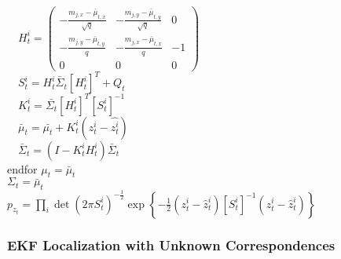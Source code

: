 \begin{algorithm}[H]
\BlankLine
$\quad H_t^i = \begin{pmatrix} -\frac{m_{j,x} - \bar{\mu}_{t,x}}{\sqrt{q}} & -\frac{m_{j,y} - \bar{\mu}_{t,y}}{\sqrt{q}} & 0 \\
                                -\frac{m_{j,y} - \bar{\mu}_{t,y}}{{q}} & -\frac{m_{j,x} - \bar{\mu}_{t,x}}{{q}} & -1  \\
                               0 & 0 & 0 \end{pmatrix}$ \\
\BlankLine
$\quad S_t^i = H_t^i \bar{\Sigma}_t [H_t^i]^T + Q_t$\\
$\quad K_t^i = \bar{\Sigma_t} [H_t^i]^T [S_t^i]^{-1}$\\
$\quad \bar{\mu}_t = \bar{\mu_t} + K_t^i (z_t^i - \hat{z_t^i})$\\
$\quad \bar{\Sigma}_t = (I - K_t^i H_t^i) \bar{\Sigma}_t$ \\
endfor
\BlankLine
$\mu_t = \bar{\mu}_t$\\
$\Sigma_t = \bar{\mu}_t$\\
\BlankLine
$p_{z_t} = \prod_i \det(2\pi S_t^i)^{-\frac{1}{2}} \exp \left\{ -\frac{1}{2} (z_t^i - \hat{z}_t^i) [S_t^i]^{-1} (z_t^i - \hat{z}_t^i) \right\}$
\BlankLine
{}
\end{algorithm}


\subsubsection{EKF Localization with Unknown Correspondences}

